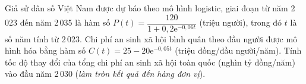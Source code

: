 \begin{ex}%
	Giả sử dân số Việt Nam được dự báo theo mô hình logistic, giai đoạn từ năm 2\,023 đến năm 2\,035 là hàm số $P(t) = \dfrac{120}{1+0{,}2\mathrm{e}^{-0{,}06t}}$ (triệu người), trong đó $t$ là số năm tính từ 2\,023. Chi phí an sinh xã hội bình quân theo đầu người được mô hình hóa bằng hàm số $C(t) = 25-20\mathrm{e}^{-0{,}05t}$ (triệu đồng/đầu người/năm). Tính tốc độ thay đổi của tổng chi phí an sinh xã hội toàn quốc (nghìn tỷ đồng/năm) vào đầu năm 2\,030 (\textit{làm tròn kết quả đến hàng đơn vị}).
	\par  {}
\end{ex}

